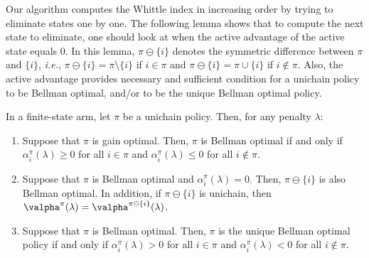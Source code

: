 Our algorithm computes the Whittle index in increasing order by trying to eliminate states one by one.
The following lemma shows that to compute the next state to eliminate, one should look at when the active advantage of the active state equals $0$.
In this lemma, $\pi\ominus\{i\}$ denotes the symmetric difference between $\pi$ and $\{i\}$, \emph{i.e.}, $\pi\ominus\{i\}=\pi\setminus\{i\}$ if $i\in\pi$ and $\pi\ominus\{i\}=\pi\cup\{i\}$ if $i\not\in\pi$.
Also, the active advantage provides necessary and sufficient condition for a unichain policy to be Bellman optimal, and/or to be the unique Bellman optimal policy. %
\begin{lem}
    \label{ch:cpt:lem:unicity_binary}
    In a finite-state arm, let $\pi$ be a unichain policy. Then, for any penalty $\lambda$:
    \begin{enumerate}[label=(\roman*)]
        \item \label{it:binary_opt1} Suppose that $\pi$ is gain optimal. Then, $\pi$ is Bellman optimal if and only if $\alpha^\pi_i(\lambda)\ge0$ for all $i\in\pi$ and $\alpha^\pi_i(\lambda)\le0$ for all $i\notin\pi$.
        \item \label{it:binary_optX} Suppose that $\pi$ is Bellman optimal and $\alpha^\pi_i(\lambda)=0$. Then, $\pi\ominus\{i\}$ is also Bellman optimal. In addition, if $\pi\ominus\{i\}$ is unichain, then $\valpha^\pi(\lambda)=\valpha^{\pi\ominus\{i\}}(\lambda)$.
        \item \label{it:binary_opt2} Suppose that $\pi$ is Bellman optimal. Then, $\pi$ is the unique Bellman optimal policy if and only if $\alpha^\pi_i(\lambda)>0$ for all $i\in\pi$ and $\alpha^\pi_i(\lambda)<0$ for all $i\notin\pi$.
    \end{enumerate}
\end{lem}
